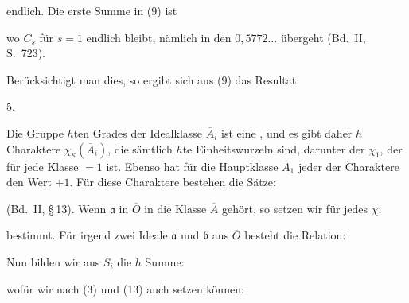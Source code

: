 
endlich. Die erste Summe in (9) ist


wo $C_s$ für $s = 1$ endlich bleibt, nämlich in den  $0{,}5772\dots$ übergeht (Bd.\ II, S.\ 723).

Berücksichtigt man dies, so ergibt sich aus (9) das Resultat:

5. 



Die Gruppe $h$ten Grades der Idealklasse $\overline{A}_i$ ist eine , und es gibt daher $h$ Charaktere $\chi_\kappa(\overline{A}_i)$, die sämtlich $h$te Einheitswurzeln sind, darunter der  $\chi_1$, der für jede Klasse $= 1$ ist. Ebenso hat für die Hauptklasse $\overline{A}_1$ jeder der Charaktere den Wert $+1$. Für diese Charaktere bestehen die Sätze:


(Bd.\ II, \S\,13). Wenn  $\mathfrak{a}$ in $\overline{O}$ in die Klasse $\overline{A}$ gehört, so setzen wir für jedes $\chi$:


 bestimmt. Für irgend zwei Ideale $\mathfrak{a}$ und $\mathfrak{b}$ aus $\overline{O}$ besteht die Relation:


Nun bilden wir aus $S_i$ die $h$ Summe:


wofür wir nach (3) und (13) auch setzen können:

